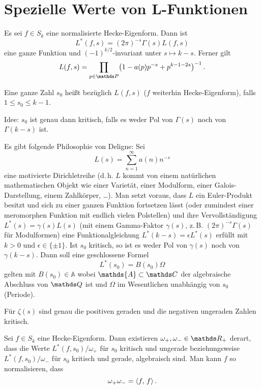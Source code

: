 \section{Spezielle Werte von L-Funktionen}

\begin{erin}
	Es sei $f \in S_k$ eine normalisierte Hecke-Eigenform. Dann ist
	\[
		L^*(f, s) = (2\pi)^{-s} \Gamma(s) L(f, s)
	\]
	eine ganze Funktion und $(-1)^{k/2}$-invariant unter $s \mapsto k - s$. Ferner gilt 
	\[
		L(f,s) = \prod_{p \in \PP} \bigl(1 - a(p)p^{-s} + p^{k-1-2s}\bigr)^{-1}
		\,.
	\]
\end{erin}

\begin{defi}
	Eine ganze Zahl $s_0$ heißt  bezüglich $L(f,s)$ ($f$ weiterhin Hecke-Eigenform), falls $1 \leq s_0 \leq k-1$. 
	
	Idee: $s_0$ ist genau dann kritisch, falls es weder Pol von $\Gamma(s)$ noch von $\Gamma(k-s)$ ist.
\end{defi}

Es gibt folgende Philosophie von Deligne: Sei 
\[
	L(s) = \sum_{n=1}^\infty a(n)n^{-s}
\]
eine \glqq{}motivierte\grqq{} Dirichletreihe (d.\,h. $L$ kommt von einem natürlichen mathematischen Objekt wie einer Varietät, einer Modulform, einer Galois-Darstellung, einem Zahlkörper, \ldots). Man setzt voraus, dass $L$ ein Euler-Produkt besitzt und sich zu einer ganzen Funktion fortsetzen lässt (oder zumindest einer meromorphen Funktion mit endlich vielen Polstellen) und ihre Vervollständigung $L^*(s) = \gamma(s)L(s)$ (mit einem Gamma-Faktor $\gamma(s)$, z.\,B. $(2\pi)^{-s} \Gamma(s)$ für Modulformen) eine Funktionalgleichung $L^*(k - s) = \epsilon L^*(s)$ erfüllt mit $k > 0$ und $\epsilon \in \{\pm1\}$. Ist $s_0$ kritisch, so ist es weder Pol von $\gamma(s)$ noch von $\gamma(k-s)$. Dann soll eine geschlossene Formel
\[
	L^*(s_0) = B(s_0) \Omega
\]
gelten mit $B(s_0) \in \mathds{A}$ wobei $\mathds{A} \subset \CC$ der algebraische Abschluss von $\QQ$ ist und $\Omega$ \glqq{}im Wesentlichen unabhängig von $s_0$\grqq{} (\glqq Periode\grqq).

\begin{bsp}
	Für $\zeta(s)$ sind genau die positiven geraden und die negativen ungeraden Zahlen kritisch.
\end{bsp}

\begin{satz}
	Sei $f \in S_k$ eine Hecke-Eigenform.
	Dann existieren $\omega_+, \omega_- \in \RR_+$ derart, dass die Werte $L^*(f, s_0)/\omega_+$ für $s_0$ kritisch und ungerade beziehungsweise $L^*(f, s_0)/\omega_-$ für $s_0$ kritisch und gerade, algebraisch sind. Man kann $f$ so normalisieren, dass
	\[
		\omega_+ \omega_- = \scalarprd ff
		\,.
	\]
\end{satz}

